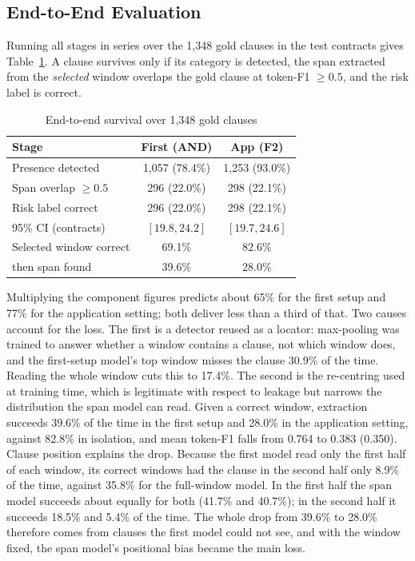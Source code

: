 \documentclass[journal]{IEEEtran}
\begin{document}
\subsection{End-to-End Evaluation}
\label{sec:e2e}
Running all stages in series over the 1,348 gold clauses in the test contracts gives
Table~\ref{tab:e2e}. A clause survives only if its category is detected, the span extracted from the
\emph{selected} window overlaps the gold clause at token-F1 $\geq 0.5$, and the risk label is
correct.

\begin{table}[!t]
\caption{End-to-end survival over 1,348 gold clauses}
\label{tab:e2e}
\centering
\small
\setlength{\tabcolsep}{4pt}
\begin{tabular}{lcc}
\toprule
\textbf{Stage} & \textbf{First (AND)} & \textbf{App (F2)}\\
\midrule
Presence detected       & 1,057 (78.4\%) & 1,253 (93.0\%)\\
Span overlap $\geq 0.5$ & 296 (22.0\%)   & 298 (22.1\%)\\
Risk label correct      & 296 (22.0\%)   & 298 (22.1\%)\\
\midrule
95\% CI (contracts)     & $[19.8, 24.2]$ & $[19.7, 24.6]$\\
\addlinespace
Selected window correct & 69.1\%         & 82.6\%\\
\quad then span found   & 39.6\%         & 28.0\%\\
\bottomrule
\end{tabular}
\end{table}

Multiplying the component figures predicts about 65\% for the first setup and 77\% for the
application setting; both deliver less than a third of that. Two causes account for the loss. The
first is a detector reused as a locator: max-pooling was trained to answer whether a window contains
a clause, not which window does, and the first-setup model's top window misses the clause 30.9\% of
the time. Reading the whole window cuts this to 17.4\%. The second is the re-centring used at
training time, which is legitimate with respect to leakage but narrows the distribution the span
model can read. Given a correct window, extraction succeeds 39.6\% of the time in the first setup
and 28.0\% in the application setting, against 82.8\% in isolation, and mean token-F1 falls from
0.764 to 0.383 (0.350). Clause position explains the drop. Because the first model read only the
first half of each window, its correct windows had the clause in the second half only 8.9\% of the
time, against 35.8\% for the full-window model. In the first half the span model succeeds about
equally for both (41.7\% and 40.7\%); in the second half it succeeds 18.5\% and 5.4\% of the time.
The whole drop from 39.6\% to 28.0\% therefore comes from clauses the first model could not see,
and with the window fixed, the span model's positional bias became the main loss.
\end{document}
